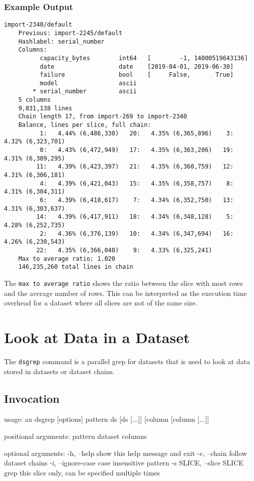 \subsubsection*{Example Output}
\begin{snugshade}
\begin{verbatim}
import-2340/default
    Previous: import-2245/default
    Hashlabel: serial_number
    Columns:
          capacity_bytes        int64   [        -1, 14000519643136]
          date                  date    [2019-04-01, 2019-06-30]
          failure               bool    [     False,       True]
          model                 ascii
        * serial_number         ascii
    5 columns
    9,831,138 lines
    Chain length 17, from import-269 to import-2340
    Balance, lines per slice, full chain:
          1:   4.44% (6,486,330)   20:   4.35% (6,365,896)    3:   4.32% (6,323,701)
          0:   4.43% (6,472,949)   17:   4.35% (6,363,206)   19:   4.31% (6,309,295)
         11:   4.39% (6,423,397)   21:   4.35% (6,360,759)   12:   4.31% (6,306,181)
          4:   4.39% (6,421,043)   15:   4.35% (6,358,757)    8:   4.31% (6,304,311)
          6:   4.39% (6,418,617)    7:   4.34% (6,352,750)   13:   4.31% (6,303,637)
         14:   4.39% (6,417,911)   18:   4.34% (6,348,128)    5:   4.28% (6,252,735)
          2:   4.36% (6,376,139)   10:   4.34% (6,347,694)   16:   4.26% (6,230,543)
         22:   4.35% (6,366,040)    9:   4.33% (6,325,241)
    Max to average ratio: 1.020
    146,235,260 total lines in chain
\end{verbatim}
\end{snugshade}
The \texttt{max to average ratio} shows the ratio between the slice
with most rows and the average number of rows.  This can be
interpreted as the execution time overhead for a dataset where all
slices are not of the same size.







\section{Look at Data in a Dataset}
The \texttt{dsgrep} command is a parallel grep for datasets that is
used to look at data stored in datasets or dataset chains.
\subsection{Invocation}
\begin{shell}
  usage: ax dsgrep [options] pattern ds [ds [...]] [column [column [...]]

    positional arguments:
    pattern
    dataset
    columns

    optional arguments:
    -h, --help            show this help message and exit
    -c, --chain           follow dataset chains
    -i, --ignore-case     case insensitive pattern
    -s SLICE, --slice SLICE
    grep this slice only, can be specified multiple times
\end{shell}

